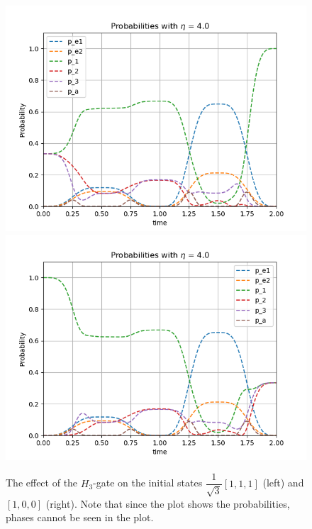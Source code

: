 \begin{figure}[H]
\label{fig:pop_H}
\includegraphics[scale=0.5]{figures/pop_plot_H111.png}
\includegraphics[scale=0.5]{figures/pop_plot_H100.png}
\caption{The effect of the $H_3$-gate on the initial states $\dfrac{1}{\sqrt{3}}[1,1,1]$ (left) and $[1,0,0]$ (right). Note that since the plot shows the probabilities, phases cannot be seen in the plot.}
\end{figure}



